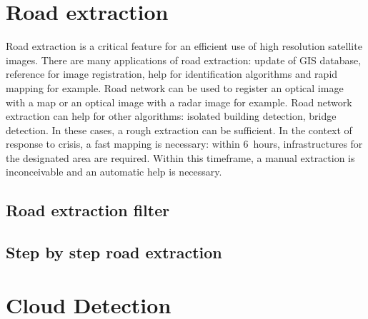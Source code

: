 \section{Road extraction}
\label{sec:RoadExtraction}

Road extraction is a critical feature for an efficient use of high resolution satellite images. There are many applications of road extraction: update of GIS database, reference for image registration, help for identification algorithms and rapid mapping for example.  Road network can be used to register an optical image with a map or an optical image with a radar image for example. Road network extraction can help for other algorithms: isolated building detection, bridge detection. In these cases, a rough extraction can be sufficient. In the context of response to crisis, a fast mapping is necessary: within 6~hours, infrastructures for the designated area are required. Within this timeframe, a manual extraction is inconceivable and an automatic help is necessary.

\subsection{Road extraction filter}



\subsection{Step by step road extraction}




%
% 
%
% 

\section{Cloud Detection}
